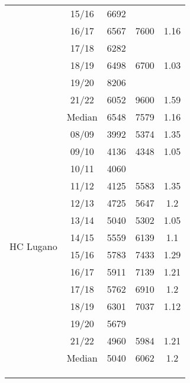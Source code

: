 \begin{longtable}[c]{p{5cm}cccc}
                                    & 15/16 & 6692 & ~ & ~ \\ 
                                    & 16/17 & 6567 & 7600 & 1.16 \\ 
                                    & 17/18 & 6282 & ~ & ~ \\ 
                                    & 18/19 & 6498 & 6700 & 1.03 \\ 
                                    & 19/20 & 8206 & ~ & ~ \\ 
                                    & 21/22 & 6052 & 9600 & 1.59 \\ 
                                    \cmidrule{2-5}
                                    & Median & 6548 & 7579 & 1.16 \\ 
                                    \cmidrule{1-5}
    \multirow[t]{14}{=}{HC Lugano}    & 08/09 & 3992 & 5374 & 1.35 \\ 
                                     & 09/10 & 4136 & 4348 & 1.05 \\ 
                                     & 10/11 & 4060 & ~ & ~ \\ 
                                     & 11/12 & 4125 & 5583 & 1.35 \\ 
                                     & 12/13 & 4725 & 5647 & 1.2 \\ 
                                     & 13/14 & 5040 & 5302 & 1.05 \\ 
                                     & 14/15 & 5559 & 6139 & 1.1 \\ 
                                     & 15/16 & 5783 & 7433 & 1.29 \\ 
                                     & 16/17 & 5911 & 7139 & 1.21 \\ 
                                     & 17/18 & 5762 & 6910 & 1.2 \\ 
                                     & 18/19 & 6301 & 7037 & 1.12 \\ 
                                     & 19/20 & 5679 & ~ & ~ \\ 
                                     & 21/22 & 4960 & 5984 & 1.21 \\ 
                                     \cmidrule{2-5}
                                     & Median & 5040 & 6062 & 1.2 \\ 
    \cmidrule{1-5}
     \multicolumn{5}{c}{} \\
    \multicolumn{5}{c}{} \\
    \multicolumn{5}{c}{} \\

\end{longtable}
